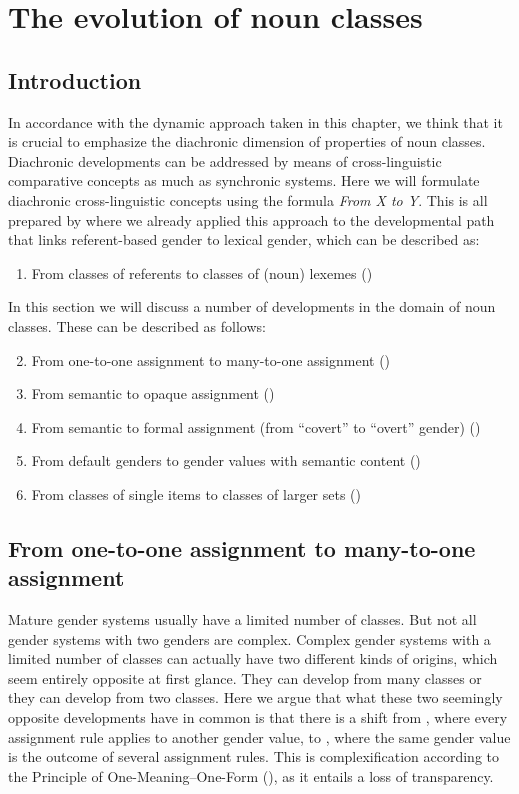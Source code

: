 \documentclass[output=collectionpaper]{langsci/langscibook}
\begin{document}
\section{The evolution of noun classes}
\label{sec:WDG:6}

  \subsection{Introduction}

In accordance with the dynamic approach taken in this chapter, we think that it is crucial to emphasize the diachronic dimension of properties of noun classes. Diachronic developments can be addressed by means of cross-linguistic comparative concepts as much as synchronic systems. Here we will formulate diachronic cross-linguistic concepts using the formula \textit{From X to Y}. This is all prepared by  where we already applied this approach to the developmental path that links referent-based gender to lexical gender, which can be described as:
\begin{enumerate}[label=(\roman*)]
\item	From classes of referents to classes of (noun) lexemes ()
\end{enumerate}
In this section we will discuss a number of developments in the domain of noun classes. These can be described as follows:
\begin{enumerate}[label=(\roman*)]
  \setcounter{enumi}{1}
\item From one-to-one assignment to many-to-one assignment ()
\item From semantic to opaque assignment ()
\item	From semantic to formal assignment (from ``covert'' to ``overt'' gender) ()
\item From default genders to gender values with semantic content ()
\item From classes of single items to classes of larger sets ()
\end{enumerate}

  \subsection{From one-to-one assignment to many-to-one assignment}
\label{sec:WDG:6.2}

Mature gender systems usually have a limited number of classes. But not all gender systems with two genders are complex. Complex gender systems with a limited number of classes can actually have two different kinds of origins, which seem entirely opposite at first glance. They can develop from many classes or they can develop from two classes. Here we argue that what these two seemingly opposite developments have in common is that there is a shift from , where every assignment rule applies to another gender value, to , where the same gender value is the outcome of several assignment rules. This is complexification according to the Principle of One-Meaning--One-Form (), as it entails a loss of transparency.
\end{document}
